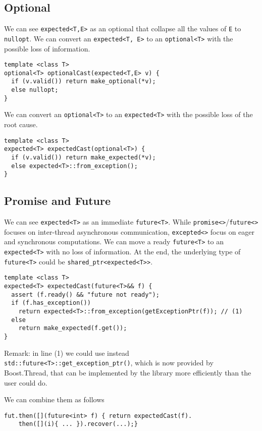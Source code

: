 \documentclass[a4paper,10pt]{article}
\newcommand{\cpp}[1]{\lstinline{#1}}
\begin{document}
\subsection{Optional}

We can see \cpp{expected<T,E>} as an optional that collapse all the values of \cpp{E} to \cpp{nullopt}. We can convert an \cpp{expected<T, E>} to an \cpp{optional<T>} with the possible loss of information.

\begin{lstlisting}
template <class T>
optional<T> optionalCast(expected<T,E> v) {
  if (v.valid()) return make_optional(*v);
  else nullopt;
}
\end{lstlisting}

We can convert an \cpp{optional<T>} to an \cpp{expected<T>} with the possible loss of the root cause.

\begin{lstlisting}
template <class T>
expected<T> expectedCast(optional<T>) {
  if (v.valid()) return make_expected(*v);
  else expected<T>::from_exception();
}
\end{lstlisting}

\subsection{Promise and Future}

We can see \cpp{expected<T>} as an immediate \cpp{future<T>}.
While \cpp{promise<>}/\cpp{future<>} focuses on inter-thread asynchronous communication, \cpp{excepted<>} focus on eager and synchronous computations.
We can move a ready \cpp{future<T>} to an \cpp{expected<T>} with no loss of information. At the end, the underlying type of \cpp{future<T>} could be \cpp{shared_ptr<expected<T>>}.

\begin{lstlisting}
template <class T>
expected<T> expectedCast(future<T>&& f) {
  assert (f.ready() && "future not ready");
  if (f.has_exception()) 
    return expected<T>::from_exception(getExceptionPtr(f)); // (1)
  else 
    return make_expected(f.get());
}
\end{lstlisting}

Remark: in line (1) we could use instead \cpp{std::future<T>::get_exception_ptr()}, which is now provided by Boost.Thread, that can be implemented by the library more efficiently than the user could do.

We can combine them as follows

\begin{lstlisting}
fut.then([](future<int> f) { return expectedCast(f).
	then([](i){ ... }).recover(...);}
\end{lstlisting}
\end{document}
